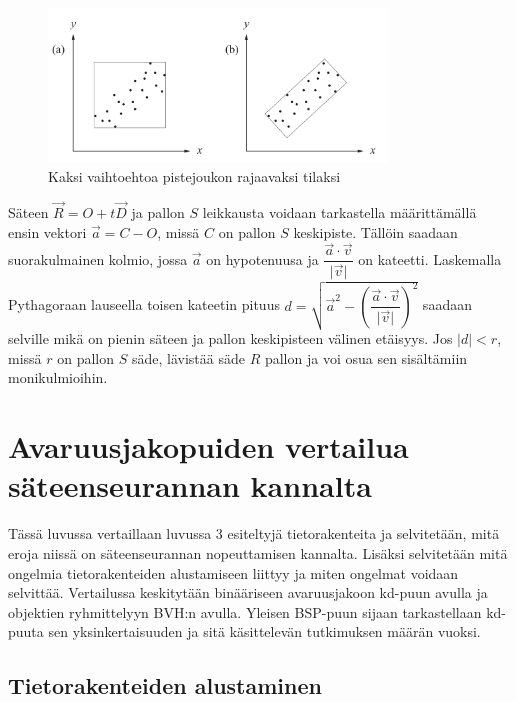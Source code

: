 \documentclass[a4paper, 12pt, titlepage]{article}
\newcommand{\abs}[1]{\vert #1 \vert} %
\begin{document}
\begin{figure}
 \centering 
 \includegraphics[width=0.8\textwidth]{img/bvh1.png}
 \vspace{0.4cm}
 \caption{Kaksi vaihtoehtoa pistejoukon rajaavaksi tilaksi \citep{lengyel}}%
 \vspace{-0.5cm} 
 \label{bvh1}
\end{figure}

Säteen $\vec{R}=O+t\vec{D}$ ja pallon $S$ leikkausta voidaan tarkastella määrittämällä ensin vektori $\vec{a} = C - O$, missä $C$ on pallon $S$ keskipiste. Tällöin saadaan suorakulmainen kolmio, jossa $\vec{a}$ on hypotenuusa ja $\dfrac{\vec{a}\cdot\vec{v}}{\abs{\vec{v}}}$ on kateetti. Laskemalla Pythagoraan lauseella toisen kateetin pituus $d = \sqrt{\vec{a}^2 - \left(\dfrac{\vec{a}\cdot\vec{v}}{\abs{\vec{v}}}\right)^2}$ saadaan selville mikä on pienin säteen ja pallon keskipisteen välinen etäisyys. Jos $\abs{d} < r$, missä $r$ on pallon $S$ säde, lävistää säde $R$ pallon ja voi osua sen sisältämiin monikulmioihin. \citep[.]{janke}    


\newpage
\section{Avaruusjakopuiden vertailua säteenseurannan kannalta}

Tässä luvussa vertaillaan luvussa 3 esiteltyjä tietorakenteita ja selvitetään, mitä eroja niissä on säteenseurannan nopeuttamisen kannalta. Lisäksi selvitetään mitä ongelmia tietorakenteiden alustamiseen liittyy ja miten ongelmat voidaan selvittää. Vertailussa keskitytään binääriseen avaruusjakoon kd-puun avulla ja objektien ryhmittelyyn BVH:n avulla. Yleisen BSP-puun sijaan tarkastellaan kd-puuta sen yksinkertaisuuden ja sitä käsittelevän tutkimuksen määrän vuoksi.

\subsection{Tietorakenteiden alustaminen}
\end{document}
